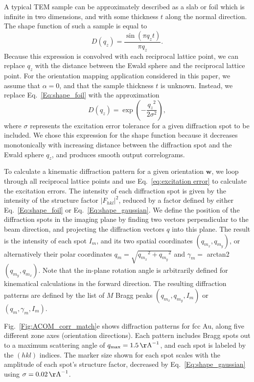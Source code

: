 \documentclass[%
 superscriptaddress,
 aip,
 amsmath,amssymb,
reprint,%
 author-year,%
longbibliography
]{revtex4-2}
\begin{document}
A typical TEM sample can be approximately described as a slab or foil which is infinite in two dimensions, and with some thickness $t$ along the normal direction. The shape function of such a sample is equal to
\begin{equation}
    D(q_z) = \frac{\sin(\pi q_z t)}{\pi q_z}.
    \label{Eq:shape_foil}
\end{equation}
Because this expression is convolved with each reciprocal lattice point, we can replace $q_z$ with the distance between the Ewald sphere and the reciprocal lattice point. For the orientation mapping application considered in this paper, we assume that $\alpha = 0$, and that the sample thickness $t$ is unknown. Instead, we replace Eq.~\ref{Eq:shape_foil} with the approximation
\begin{equation}
    D(q_z) = 
    \exp\left(
    -\frac{{q_z}^2}{2 \sigma^2}
    \right),
    \label{Eq:shape_gaussian}
\end{equation}
where $\sigma$ represents the excitation error tolerance for a given diffraction spot to be included. We chose this expression for the shape function because it decreases monotonically with increasing distance between the diffraction spot and the Ewald sphere $q_z$, and produces smooth output correlograms.



To calculate a kinematic diffraction pattern for a given orientation $\bm{w}$, we loop through all reciprocal lattice points and use Eq.~\ref{eq:excitation error} to calculate the excitation errors. The intensity of each diffraction spot is given by the intensity of the structure factor $|F_{hkl}|^2$, reduced by a factor defined by either Eq.~\ref{Eq:shape_foil} or Eq.~\ref{Eq:shape_gaussian}. We define the position of the diffraction spots in the imaging plane by finding two vectors perpendicular to the beam direction, and projecting the diffraction vectors $q$ into this plane. The result is the intensity of each spot $I_m$, and its two spatial coordinates $(q_{m_x},q_{m_y})$, or alternatively their polar coordinates $q_m = \sqrt{{q_{m_x}}^2 + {q_{m_y}}^2}$ and $\gamma_m =$ arctan2$(q_{m_y}, q_{m_x})$. Note that the in-plane rotation angle is arbitrarily defined for kinematical calculations in the forward direction. The resulting diffraction patterns are defined by the list of $M$ Bragg peaks $(q_{m_x},q_{m_y},I_m)$ or $(q_m,\gamma_m ,I_m)$.

Fig.~\ref{Fig:ACOM_corr_match}e shows diffraction patterns for fcc Au, along five different zone axes (orientation directions). Each pattern includes Bragg spots out to a maximum scattering angle of $q_{\rm{max}} = 1.5 \, \rm{\AA}^{-1}$, and each spot is labeled by the $(hkl)$ indices. The marker size shown for each spot scales with the amplitude of each spot's structure factor, decreased by Eq.~\ref{Eq:shape_gaussian} using $\sigma = 0.02 \, \rm{\AA}^{-1}$.
\end{document}
